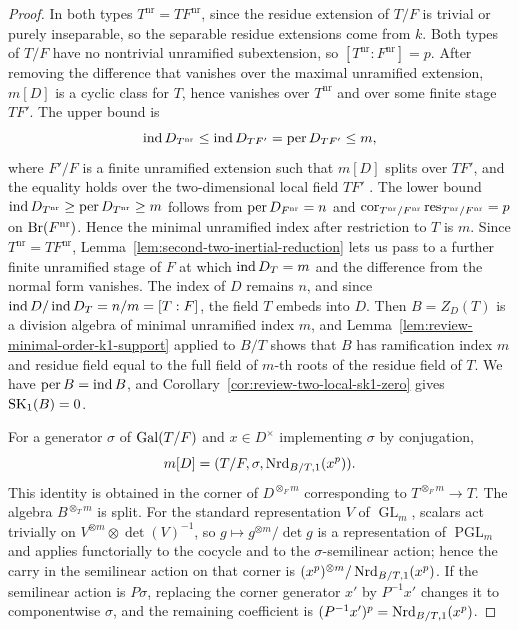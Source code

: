 \begin{proof}
In both types $T^{\mathrm{nr}}=TF^{\mathrm{nr}}$, since the residue extension of $T/F$ is trivial or purely inseparable, so the separable residue extensions come from $k$.
Both types of $T/F$ have no nontrivial unramified subextension, so $[T^{\mathrm{nr}}:F^{\mathrm{nr}}]=p$.
After removing the difference that vanishes over the maximal unramified extension, $m[D]$ is a cyclic class for $T$, hence vanishes over $T^{\mathrm{nr}}$ and over some finite stage $TF'$.
The upper bound is
\[
 \operatorname{ind} D_{T^{\mathrm{nr}}}\le\operatorname{ind} D_{TF'}=\operatorname{per} D_{TF'}\le m,
\]
where $F'/F$ is a finite unramified extension such that $m[D]$ splits over $TF'$, and the equality holds over the two-dimensional local field $TF'$ \cite[Corollary 5.1, Proposition 5.2]{Chipchakov2022}.
The lower bound $\operatorname{ind} D_{T^{\mathrm{nr}}}\ge\operatorname{per} D_{T^{\mathrm{nr}}}\ge m$ follows from $\operatorname{per} D_{F^{\mathrm{nr}}}=n$ and $\operatorname{cor}_{T^{\mathrm{nr}}/F^{\mathrm{nr}}}\operatorname{res}_{T^{\mathrm{nr}}/F^{\mathrm{nr}}}=p$ on $\operatorname{Br}(F^{\mathrm{nr}})$.
Hence the minimal unramified index after restriction to $T$ is $m$.
Since $T^{\mathrm{nr}}=TF^{\mathrm{nr}}$, Lemma~\ref{lem:second-two-inertial-reduction} lets us pass to a further finite unramified stage of $F$ at which $\operatorname{ind} D_T=m$ and the difference from the normal form vanishes.
The index of $D$ remains $n$, and since $\operatorname{ind} D/\operatorname{ind} D_T=n/m=[T:F]$, the field $T$ embeds into $D$.
Then $B=Z_D(T)$ is a division algebra of minimal unramified index $m$, and Lemma~\ref{lem:review-minimal-order-k1-support} applied to $B/T$ shows that $B$ has ramification index $m$ and residue field equal to the full field of $m$-th roots of the residue field of $T$.
We have $\operatorname{per} B=\operatorname{ind} B$, and Corollary~\ref{cor:review-two-local-sk1-zero} gives $\operatorname{SK}_1(B)=0$.

For a generator $\sigma$ of $\operatorname{Gal}(T/F)$ and $x\in D^\times$ implementing $\sigma$ by conjugation,
\[
 m[D]=(T/F,\sigma,\operatorname{Nrd}_{B/T,1}(x^p)).
\]
This identity is obtained in the corner of $D^{\otimes_F m}$ corresponding to $T^{\otimes_F m}\to T$.
The algebra $B^{\otimes_T m}$ is split.
For the standard representation $V$ of $\operatorname{GL}_m$, scalars act trivially on $V^{\otimes m}\otimes\det(V)^{-1}$, so $g\mapsto g^{\otimes m}/\det g$ is a representation of $\operatorname{PGL}_m$ and applies functorially to the cocycle and to the $\sigma$-semilinear action; hence the carry in the semilinear action on that corner is $(x^p)^{\otimes m}/\operatorname{Nrd}_{B/T,1}(x^p)$.
If the semilinear action is $P\sigma$, replacing the corner generator $x'$ by $P^{-1}x'$ changes it to componentwise $\sigma$, and the remaining coefficient is $(P^{-1}x')^p=\operatorname{Nrd}_{B/T,1}(x^p)$.


\end{proof}
